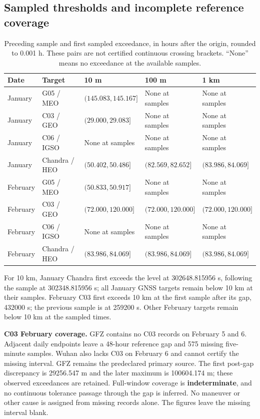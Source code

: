 \subsection{Sampled thresholds and incomplete reference coverage}
\label{sec:orbit-thresholds}
\begin{table}[htbp]
\centering\small
\caption{Preceding sample and first sampled exceedance, in hours after the
origin, rounded to 0.001 h. These pairs are not certified continuous crossing
brackets. ``None'' means no exceedance at the available samples.}
\label{tab:orbit-first-exceedance}
\begin{tabularx}{\linewidth}{@{}llYYY@{}}
\toprule
Date & Target & 10 m & 100 m & 1 km\\
\midrule
January & G05 / MEO & $(145.083,145.167]$ & None at samples & None at samples\\
January & C03 / GEO & $(29.000,29.083]$ & None at samples & None at samples\\
January & C06 / IGSO & None at samples & None at samples & None at samples\\
January & Chandra / HEO & $(50.402,50.486]$ & $(82.569,82.652]$ & $(83.986,84.069]$\\
February & G05 / MEO & $(50.833,50.917]$ & None at samples & None at samples\\
February & C03 / GEO & $(72.000,120.000]$ & $(72.000,120.000]$ & $(72.000,120.000]$\\
February & C06 / IGSO & None at samples & None at samples & None at samples\\
February & Chandra / HEO & $(83.986,84.069]$ & $(83.986,84.069]$ & $(83.986,84.069]$\\
\bottomrule
\end{tabularx}
\end{table}

For 10 km, January Chandra first exceeds the level at 302648.815956 s,
following the sample at 302348.815956 s; all January GNSS targets remain below
10 km at their samples. February C03 first exceeds 10 km at the first sample
after its gap, 432000 s; the previous sample is at 259200 s. Other February
targets remain below 10 km at the sampled times.

\textbf{C03 February coverage.} GFZ contains no C03 records on February 5 and
6. Adjacent daily endpoints leave a 48-hour reference gap and 575 missing
five-minute samples. Wuhan also lacks C03 on February 6 and cannot certify the
missing interval. GFZ remains the predeclared primary source. The first
post-gap discrepancy is 29256.547 m and the later maximum is 100604.174 m;
these observed exceedances are retained. Full-window coverage is
\textbf{indeterminate}, and no continuous tolerance passage through the gap is
inferred. No maneuver or other cause is assigned from missing records alone.
The figures leave the missing interval blank.

